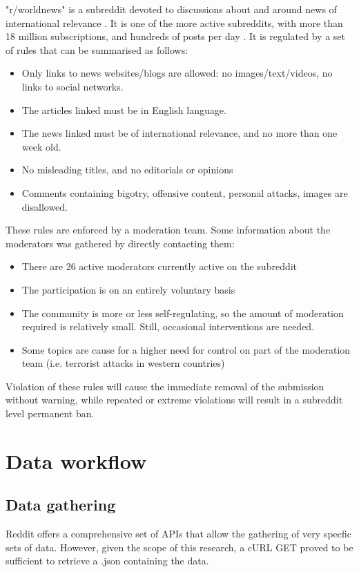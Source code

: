 \documentclass{article}
\begin{document}
"r/worldnews" is a subreddit devoted to discussions about and around news of international relevance . It is one of the more active subreddits, with more than 18 million subscriptions, and hundreds of posts per day \cite{rworldnews}. It is regulated by a set of rules that can be summarised as follows:
\begin{itemize}
\item Only links to news websites/blogs are allowed: no images/text/videos, no links to social networks.
\item The articles linked must be in English language.
\item The news linked must be of international relevance, and no more than one week old.
\item No misleading titles, and no editorials or opinions
\item Comments containing bigotry, offensive content, personal attacks, images are disallowed.
\end{itemize}

These rules are enforced by a moderation team. Some information about the moderators was gathered by directly contacting them:
\begin{itemize}
\item There are 26 active moderators currently active on the subreddit
\item The participation is on an entirely voluntary basis
\item The community is more or less self-regulating, so the amount of moderation required is relatively small. Still, occasional interventions are needed.
\item Some topics are cause for a higher need for control on part of the moderation team (i.e. terrorist attacks in western countries)
\end{itemize}

Violation of these rules will cause the immediate removal of the submission without warning, while repeated or extreme violations will result in a subreddit level permanent ban.
\pagebreak
\section{Data workflow}
\subsection{Data gathering}
Reddit offers a comprehensive set of APIs that allow the gathering of very specfic sets of data. However, given the scope of this research, a cURL\cite{curl} GET proved to be sufficient to retrieve a .json containing the data. 
\end{document}
